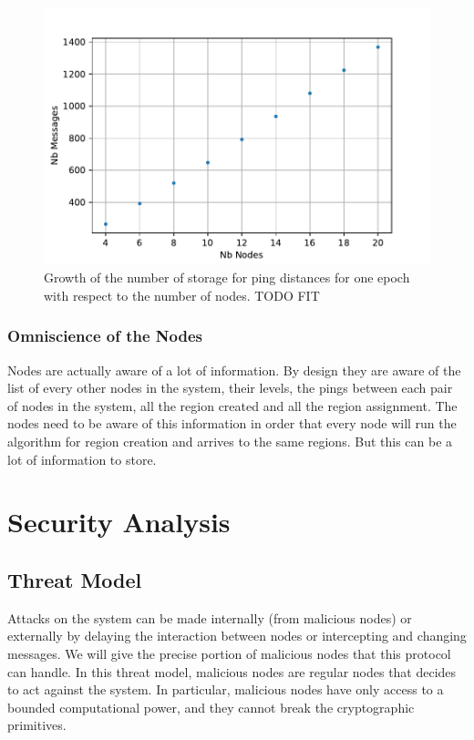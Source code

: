 \documentclass[a4paper,11pt,oneside]{report}
\begin{document}
\begin{figure}[!h] 
\centering
\includegraphics[width=350pt]{figures/storage-plot}
\caption{Growth of the number of storage for ping distances for one epoch with
    respect to the number of nodes. \color{red} TODO FIT \color{black} } \label{fig:storage-plot}
\end{figure}

 
\subsubsection{Omniscience of the Nodes}
Nodes are actually aware of a lot of information. By design they are aware of
the list of every other nodes in the system, their levels, the pings between
each pair of nodes in the system, all the region created and all the region
assignment. The nodes need to be aware of this information in order that
every node will run the algorithm for region creation and arrives to the same
regions. But this can be a lot of information to store.

\section{Security Analysis}

\subsection{Threat Model}
Attacks on the system can be made internally (from malicious nodes) or
externally by delaying the interaction between nodes or intercepting and
changing messages. We will give the precise portion of malicious nodes that
this protocol can handle. In this threat model, malicious nodes are regular
nodes that decides to act against the system. In particular, malicious nodes
have only access to a bounded computational power, and they cannot break the
cryptographic primitives. 
\end{document}
